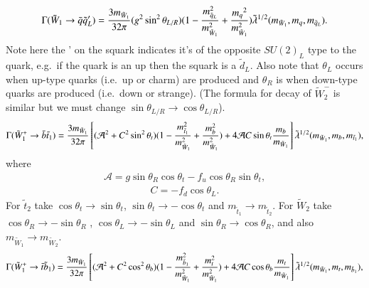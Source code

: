\documentclass[final,3p,times,pdflatex]{elsarticle}
\begin{document}
\begin{equation}\label{ch1qqL}
\begin{aligned}
\Gamma (\tilde{W}_1 \rightarrow \bar{q} \tilde{q}_L') = {3 m_{\tilde{W}_1} \over 32\pi} (g^2\sin^2\theta_{L/R}) (1- {m_{\tilde{q}_L}^2 \over m_{\tilde{W}_1}^2} + {{m_q}^2 \over m_{\tilde{W}_1}^2 }) \tilde{\lambda}^{1/2}(m_{\tilde{W}_1},m_q, m_{\tilde{q}_L}).
\end{aligned}
\end{equation} 
Note here the ' on the squark indicates it's of the opposite $SU(2)_L$ type to
the quark, e.g.\ if the quark 
is an up then the squark is a $\tilde{d}_L$. Also note that $\theta_L$ occurs when up-type quarks (i.e.\ up or charm)
are produced and $\theta_R$ is when down-type quarks are produced (i.e.\ down or strange).
(The formula for decay of $\tilde{W}_{2}^{-}$ is similar but we must change $\sin \theta_{L/R} \rightarrow \cos\theta_{L/R}$).
\begin{equation}\label{ch1bst1}
\begin{aligned}
\Gamma (\tilde{W}_1^+ \rightarrow \bar{b} \tilde{t}_{1}) = {3 m_{\tilde{W}_1} \over 32\pi} \left[(\mathcal{A}^2 + C^2 \sin^2\theta_t) (1 - {m_{\tilde{t}_1}^2 \over {m_{\tilde{W}_1}^2}} + {m_{b}^2 \over {m_{\tilde{W}_1}^2} }) + 4\mathcal{A}C\sin\theta_t {m_b \over m_{\tilde{W}_1}}\right] \tilde{\lambda}^{1/2}(m_{\tilde{W}_1},m_b, m_{\tilde{t}_1}),
\end{aligned}
\end{equation} 
where
\begin{equation}
\begin{aligned}
\mathcal{A} = g\sin\theta_R\cos\theta_t - f_u \cos\theta_R\sin\theta_t,
\end{aligned}
\end{equation}
\begin{equation}
\begin{aligned}
C = -f_d \cos\theta_L.
\end{aligned}
\end{equation}
For $\tilde{t}_2$ take $\cos\theta_t \rightarrow \sin\theta_t$, $\sin\theta_t \rightarrow -\cos\theta_t$ and $m_{\tilde{t}_1} \rightarrow m_{\tilde{t}_2}$.
For $\tilde{W}_2$ take $\cos\theta_R \rightarrow -\sin\theta_R$ , $\cos\theta_L \rightarrow -\sin\theta_L$ and $\sin\theta_R \rightarrow \cos\theta_R$, and also $m_{\tilde{W}_{1}} \rightarrow m_{\tilde{W}_{2}}$.
\begin{equation}\label{ch1tsb1}
\begin{aligned}
\Gamma (\tilde{W}_1^+ \rightarrow \bar{t} \tilde{b}_{1}) = {3 m_{\tilde{W}_1} \over 32\pi} \left[(\mathcal{A}^2 + C^2 \cos^2\theta_b) (1 - {m_{\tilde{b}_1}^2 \over {m_{\tilde{W}_1}^2}} + {m_{t}^2 \over {m_{\tilde{W}_1}^2} }) + 4\mathcal{A}C\cos\theta_b {m_t \over m_{\tilde{W}_1}}\right] \tilde{\lambda}^{1/2}(m_{\tilde{W}_1},m_t, m_{\tilde{b}_1}),
\end{aligned}
\end{equation} 
\end{document}
